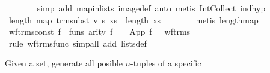 \begin{isabellebody}
\ \ \ \ \ \ \isamarkupfalse%
\ {}simp\ add{}\ map{}in{}lists\ image{}def{}\ auto{}\ metis\ Int{}Collect\ ind{}hyp{}\isanewline
\ \ \ \ \isamarkupfalse%
\ {}length\ {}map\ {}trm{}subst\ v\ s{}\ xs{}\ {}\ length\ xs{}\isanewline
\ \ \ \ \ \ \isamarkupfalse%
\ {}metis\ length{}map{}\isanewline
\ \ \isamarkupfalse%
\isanewline
{}\isamarkupfalse%
%
\endisatagproof
{\isafoldproof}%
%
\isadelimproof
\isanewline
%
\endisadelimproof
\isanewline
{}\isamarkupfalse%
\ wf{}trms{}const{}\ {}{}f\ {}\ funs{}\ arity\ f\ {}\ {}{}\ {}\ App\ f\ {}{}\ {}\ wf{}trms{}\isanewline
%
\isadelimproof
\ \ %
\endisadelimproof
%
\isatagproof
{}\isamarkupfalse%
\ {}rule\ wf{}trms{}func{}\ simp{}all\ add{}\ lists{}def{}%
\endisatagproof
{\isafoldproof}%
%
\isadelimproof
%
\endisadelimproof
%
\isamarkuptrue%
%
\begin{isamarkuptext}%
Given a set, generate all posible $n$-tuples of a specific

\end{isamarkuptext}
\end{isabellebody}
